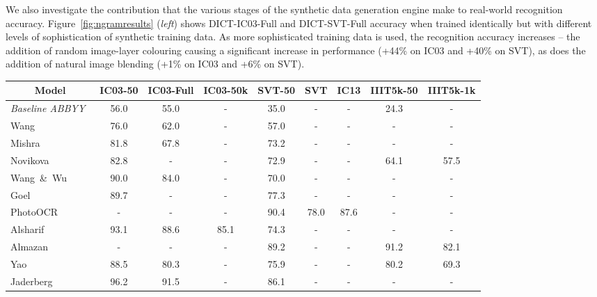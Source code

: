 \documentclass{article} \usepackage{nips14submit_e,times}
\begin{document}
We also investigate the contribution that the various stages of the synthetic data generation engine make to real-world recognition accuracy. Figure~\ref{fig:ngramresults} (\emph{left}) shows DICT-IC03-Full and DICT-SVT-Full accuracy when trained identically but with different levels of sophistication of synthetic training data. As more sophisticated training data is used, the recognition accuracy increases -- the addition of random image-layer colouring causing a significant increase in performance (+44\% on IC03 and +40\% on SVT), as does the addition of natural image blending (+1\% on IC03 and +6\% on SVT).

\setlength{\tabcolsep}{3pt}
\begin{table}[t]
\begin{center}
\scriptsize
\begin{tabular}[t]{|l||c|c|c|c|c|c|c|c|} 
\hline
\multicolumn{1}{|c||}{\centering Model} & 
\multicolumn{1}{c|}{\centering IC03-50} &
\multicolumn{1}{c|}{\centering IC03-Full} &
\multicolumn{1}{c|}{\centering IC03-50k} &
\multicolumn{1}{c|}{\centering SVT-50} &
\multicolumn{1}{c|}{\centering SVT} &
\multicolumn{1}{c|}{\centering IC13} &
\multicolumn{1}{c|}{\centering IIIT5k-50} &
\multicolumn{1}{c|}{\centering IIIT5k-1k} \\
\hline\hline
\rowcolor{Gray}
\emph{Baseline ABBYY}~\cite{Wang11} & 56.0 & 55.0 & - & 35.0 & - & - & 24.3 & -\\
Wang~\cite{Wang11}          & 76.0 & 62.0 & - & 57.0 & - & - & - & -\\
\rowcolor{Gray}
Mishra~\cite{Mishra12}      & 81.8 & 67.8 & - & 73.2 & - & - & - & -\\
Novikova~\cite{Novikova12}  & 82.8 & - & - & 72.9 & - & - & 64.1 & 57.5\\
\rowcolor{Gray}
Wang~\&~Wu~\cite{Wang12}    & 90.0 & 84.0 & - & 70.0 & - & - & - & -\\
Goel~\cite{Goel13}          & 89.7 & - & - & 77.3 & - & - & - & -\\
\rowcolor{Gray}
PhotoOCR~\cite{Bissacco13}& - & - & - & 90.4 & 78.0 & 87.6 & - & -\\
Alsharif~\cite{Alsharif13}  & 93.1 & 88.6 & 85.1 & 74.3 & - & - & - & -\\
\rowcolor{Gray}
Almazan~\cite{Almazan14} & - & - & - & 89.2 & - & - & 91.2 & 82.1\\
Yao~\cite{Yao14}  & 88.5 & 80.3 & - & 75.9 & - & - & 80.2 & 69.3\\
\rowcolor{Gray}
Jaderberg~\cite{Jaderberg14a}  & 96.2 & 91.5 & - & 86.1 & - & - & - & -\\

\end{tabular}
\end{center}
\end{table}
\end{document}

